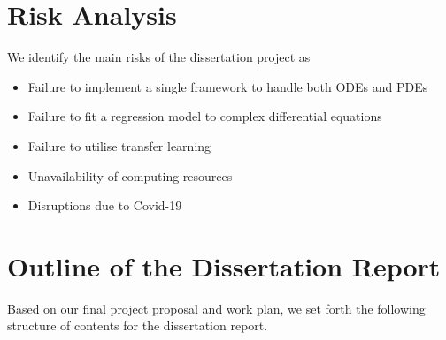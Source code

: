\documentclass{article}
\begin{document}
\section{Risk Analysis}

We identify the main risks of the dissertation project as

\begin{itemize}
    \item Failure to implement a single framework to handle both ODEs and PDEs
    \item Failure to fit a regression model to complex differential equations
    \item Failure to utilise transfer learning
    \item Unavailability of computing resources
    \item Disruptions due to Covid-19
\end{itemize}

\section{Outline of the Dissertation Report}

Based on our final project proposal and work plan, we set forth the following structure of contents for the dissertation report.
\end{document}
